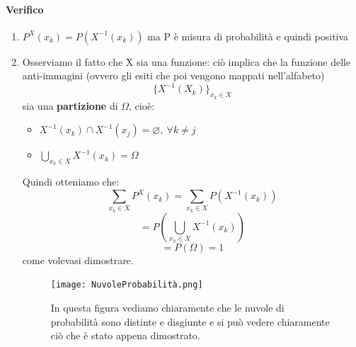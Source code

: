 \documentclass{report}
\begin{document}
\paragraph{Verifico} \begin{enumerate}
    \item \(P^X(x_k) = P(X^{-1}(x_k))\) ma P è misura di probabilità e quindi positiva
    \item Osserviamo il fatto che X sia una funzione: ciò implica che la funzione delle anti-immagini (ovvero gli esiti che poi vengono mappati nell'alfabeto) \[\{X^{-1}(X_k)\}_{x_k \in \textit{X}}\] sia una \textbf{partizione} di \(\Omega\), cioè: \begin{itemize}
        \item \(X^{-1}(x_k) \cap X^{-1}(x_j) = \varnothing,\ \forall k \neq j\)
        \item \(\bigcup_{x_k \in \textit{X}} X^{-1}(x_k) = \Omega\)
    \end{itemize}
    Quindi otteniamo che: \[\sum_{x_k \in \textit{X}}P^X (x_k) = \sum_{x_k \in \textit{X}}P(X^{-1}(x_k))\] \[= P(\bigcup_{x_k \in \textit{X}} X^{-1} (x_k))\] \[= P(\Omega) = 1\] come volevasi dimostrare.
    \begin{figure}[hb]
        \centering
        \texttt{[image: NuvoleProbabilità.png]}
        \caption{In questa figura vediamo chiaramente che le nuvole di probabilità sono distinte e disgiunte e si può vedere chiaramente ciò che è stato appena dimostrato.}
        \label{fig:NuvoleProbabilita}
    \end{figure}
\end{enumerate}
\clearpage
\end{document}
